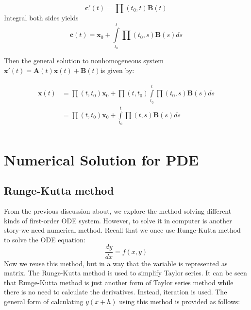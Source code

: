 \documentclass[a4paper]{article}
\begin{document}
\begin{equation}
\mathbf{c}'(t)=\prod ({{t}_{0}},t)\mathbf{B}(t)
\end{equation}
Integral both sides yields
\begin{equation}
\mathbf{c}(t)={{\mathbf{x}}_{0}}+\int\limits_{{{t}_{0}}}^{t}{\prod ({{t}_{0}},s)\mathbf{B}(s)ds}
\end{equation}

Then the general solution to nonhomogeneous system $\mathbf{x'}(t)=\mathbf{A}(t)\mathbf{x}(t)+\mathbf{B}(t)$is given by:

\begin{eqnarray}     %
\left.                       %
\begin{array}{lll}       %
\mathbf{x}(t)&=\prod (t,{{t}_{0}}){{\mathbf{x}}_{0}}+\prod (t,{{t}_{0}})\int\limits_{{{t}_{0}}}^{t}{\prod ({{t}_{0}},s)\mathbf{B}(s)ds} \\
 & =\prod (t,{{t}_{0}}){{\mathbf{x}}_{0}}+\int\limits_{{{t}_{0}}}^{t}{\prod (t,s)\mathbf{B}(s)ds} \\
\end{array}              %
\right.                       %
\end{eqnarray}


\section{Numerical Solution for PDE}
\subsection{Runge-Kutta method}
From the previous discussion about, we explore the method solving different kinds of first-order ODE system. However, to solve it in computer is another story-we need numerical method. Recall that we once use Runge-Kutta method to solve the ODE equation:
\begin{equation}
\frac{{dy}}
{{dx}} = f\left( {x,y} \right)
\end{equation}
Now we reuse this method, but in a way that the variable is represented as matrix. The Runge-Kutta method is used to simplify Taylor series. It can be seen that Runge-Kutta method is just another form of Taylor series method while there is no need to calculate the derivatives. Instead, iteration is used. The general form of calculating $y(x+h)$ using this method is provided as follows:
\end{document}
